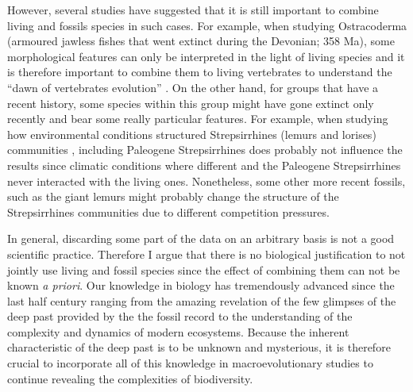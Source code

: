 However, several studies have suggested that it is still important to combine living and fossils species in such cases.
For example, when studying Ostracoderma (armoured jawless fishes that went extinct during the Devonian; 358 Ma), some morphological features can only be interpreted in the light of living species and it is therefore important to combine them to living vertebrates to understand the ``dawn of vertebrates evolution'' \citep{Janvier2015}.
On the other hand, for groups that have a recent history, some species within this group might have gone extinct only recently and bear some really particular features.
For example, when studying how environmental conditions structured Strepsirrhines (lemurs and lorises) communities \citep{Kamilar}, including Paleogene Strepsirrhines does probably not influence the results since climatic conditions where different and the Paleogene Strepsirrhines never interacted with the living ones.
Nonetheless, some other more recent fossils, such as the giant lemurs \citep[that went extinct only 600 years ago and were two order of magnitude bigger than living lemurs;][]{goodman2003introduction} might probably change the structure of the Strepsirrhines communities due to different competition pressures.

In general, discarding some part of the data on an arbitrary basis is not a good scientific practice.
Therefore I argue that there is no biological justification to not jointly use living and fossil species since the effect of combining them can not be known \textit{a priori}.
Our knowledge in biology has tremendously advanced since the last half century ranging from the amazing revelation of the few glimpses of the deep past provided by the the fossil record to the understanding of the complexity and dynamics of modern ecosystems.
Because the inherent characteristic of the deep past is to be unknown and mysterious, it is therefore crucial to incorporate all of this knowledge in macroevolutionary studies to continue revealing the complexities of biodiversity.


%